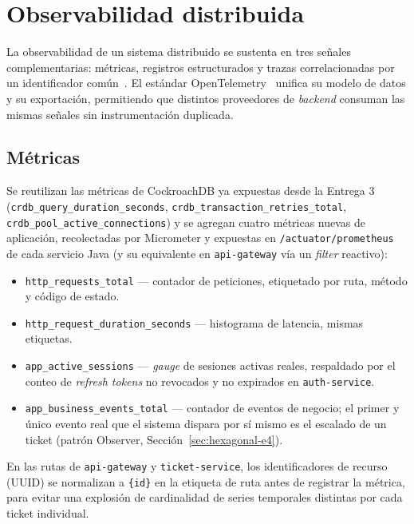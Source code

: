 \section{Observabilidad distribuida}
\label{sec:observabilidad}

La observabilidad de un sistema distribuido se sustenta en tres señales complementarias:
métricas, registros estructurados y trazas correlacionadas por un identificador
común~\cite{sigelman2010dapper,beyer2016sre}. El estándar OpenTelemetry~\cite{opentelemetry2024spec}
unifica su modelo de datos y su exportación, permitiendo que distintos proveedores de \emph{backend}
consuman las mismas señales sin instrumentación duplicada.

\subsection{Métricas}

Se reutilizan las métricas de CockroachDB ya expuestas desde la Entrega 3
(\texttt{crdb\_query\_duration\_seconds}, \texttt{crdb\_transaction\_retries\_total},
\texttt{crdb\_pool\_active\_connections}) y se agregan cuatro métricas nuevas de aplicación,
recolectadas por Micrometer y expuestas en \texttt{/actuator/prometheus} de cada servicio Java (y
su equivalente en \texttt{api-gateway} vía un \emph{filter} reactivo):

\begin{itemize}[nosep]
  \item \texttt{http\_requests\_total} --- contador de peticiones, etiquetado por ruta, método y
        código de estado.
  \item \texttt{http\_request\_duration\_seconds} --- histograma de latencia, mismas etiquetas.
  \item \texttt{app\_active\_sessions} --- \emph{gauge} de sesiones activas reales, respaldado por
        el conteo de \emph{refresh tokens} no revocados y no expirados en \texttt{auth-service}.
  \item \texttt{app\_business\_events\_total} --- contador de eventos de negocio; el primer y
        único evento real que el sistema dispara por sí mismo es el escalado de un ticket
        (patrón Observer, Sección~\ref{sec:hexagonal-e4}).
\end{itemize}

En las rutas de \texttt{api-gateway} y \texttt{ticket-service}, los identificadores de recurso
(UUID) se normalizan a \texttt{\{id\}} en la etiqueta de ruta antes de registrar la métrica, para
evitar una explosión de cardinalidad de series temporales distintas por cada ticket individual.

